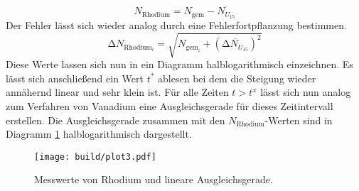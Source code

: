 \begin{equation*}
N_{\text{Rhodium}} = N_{\text{gem}} - \overline{N_{U_{15}}}
\end{equation*}
Der Fehler lässt sich wieder analog durch eine Fehlerfortpflanzung bestimmen.
\begin{equation*}
\increment N_{{\text{Rhodium}_{i}}} = \sqrt{N_{{\text{gem}_{i}}} + (\overline{\increment N_{U_{15}}})^{2} }
\end{equation*}
Diese Werte lassen sich nun in ein Diagramm halblogarithmisch einzeichnen. Es lässt sich anschließend ein Wert $t^{*}$ ablesen bei dem die Steigung wieder annähernd
linear und sehr klein ist. Für alle Zeiten $t > t^{x}$ lässt sich nun analog zum Verfahren von Vanadium eine Ausgleichsgerade für dieses Zeitintervall erstellen.
Die Ausgleichsgerade zusammen mit den $N_{\text{Rhodium}}$-Werten sind in Diagramm \ref{fig:plot3} halblogarithmisch dargestellt.

\begin{figure}[ht!]
  \centering
  \texttt{[image: build/plot3.pdf]}
  \caption{Messwerte von Rhodium und lineare Ausgleichsgerade.}
  \label{fig:plot3}
\end{figure}

